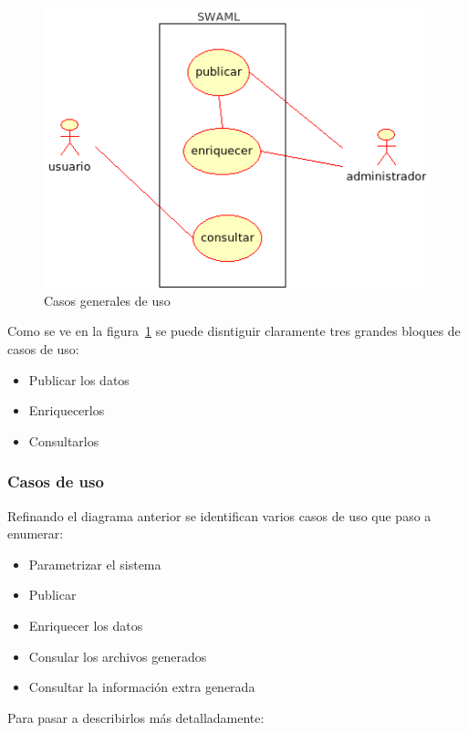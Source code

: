 \begin{figure}[ht]
 	\centering
	\includegraphics[width=12cm]{images/uml/casos-uso/general.png}
	\caption{Casos generales de uso}
	\label{fig:uml:casos-uso}
\end{figure}

Como se ve en la figura~\ref{fig:uml:casos-uso} se puede disntiguir claramente
tres grandes bloques de casos de uso:

\begin{itemize}
 \item Publicar los datos
 \item Enriquecerlos
 \item Consultarlos
\end{itemize}

\subsubsection{Casos de uso}\label{sec:casos-uso}

Refinando el diagrama anterior se identifican varios casos de uso que paso a
enumerar:

\begin{itemize}
 \item Parametrizar el sistema
 \item Publicar
 \item Enriquecer los datos
 \item Consular los archivos generados
 \item Consultar la información extra generada
\end{itemize}

Para pasar a describirlos más detalladamente:

